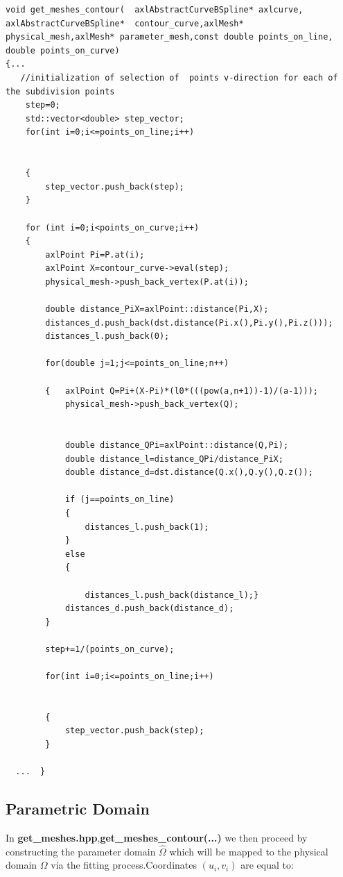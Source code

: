 \documentclass[12pt,a4paper]{article}
\begin{document}
\begin{lstlisting}[label=some-code,caption=Creation of the physical mesh of points]
void get_meshes_contour(  axlAbstractCurveBSpline* axlcurve, axlAbstractCurveBSpline*  contour_curve,axlMesh* physical_mesh,axlMesh* parameter_mesh,const double points_on_line, double points_on_curve)
{...   
   //initialization of selection of  points v-direction for each of the subdivision points
    step=0;
    std::vector<double> step_vector;
    for(int i=0;i<=points_on_line;i++)


    {
        step_vector.push_back(step);
    }

    for (int i=0;i<points_on_curve;i++)
    {
        axlPoint Pi=P.at(i);
        axlPoint X=contour_curve->eval(step);
        physical_mesh->push_back_vertex(P.at(i));

        double distance_PiX=axlPoint::distance(Pi,X);
        distances_d.push_back(dst.distance(Pi.x(),Pi.y(),Pi.z()));
        distances_l.push_back(0);

        for(double j=1;j<=points_on_line;n++)

        {   axlPoint Q=Pi+(X-Pi)*(l0*(((pow(a,n+1))-1)/(a-1)));
            physical_mesh->push_back_vertex(Q);


            double distance_QPi=axlPoint::distance(Q,Pi);
            double distance_l=distance_QPi/distance_PiX;
            double distance_d=dst.distance(Q.x(),Q.y(),Q.z());

            if (j==points_on_line)
            {
                distances_l.push_back(1);
            }
            else
            {

                distances_l.push_back(distance_l);}
            distances_d.push_back(distance_d);
        }

        step+=1/(points_on_curve);

        for(int i=0;i<=points_on_line;i++)


        {
            step_vector.push_back(step);
        }

  ...  }

\end{lstlisting}


\subsection{Parametric Domain}


In \textbf{{get\_meshes.hpp}},\textbf{get\_meshes\_contour(...)} we then proceed by constructing the parameter domain $\widehat{\Omega}$ which will be mapped to the physical domain $\Omega$ via the fitting process.Coordinates $(u_{i},v_{i})$ are equal to:
\end{document}
